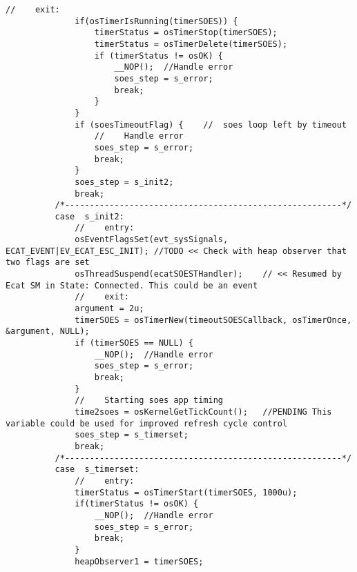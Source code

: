 \begin{lstlisting}[label=lst:soesAPP DSM,caption={Source code for SOES APP DSM}]
              //	exit:
              if(osTimerIsRunning(timerSOES)) {
                  timerStatus = osTimerStop(timerSOES);
                  timerStatus = osTimerDelete(timerSOES);
                  if (timerStatus != osOK) {
                      __NOP();	//Handle error
                      soes_step = s_error;
                      break;
                  }
              }
              if (soesTimeoutFlag) {	//	soes loop left by timeout
                  //	Handle error
                  soes_step = s_error;
                  break;
              }
              soes_step = s_init2;
              break;
          /*--------------------------------------------------------*/
          case  s_init2:
              //	entry:
              osEventFlagsSet(evt_sysSignals, ECAT_EVENT|EV_ECAT_ESC_INIT);	//TODO << Check with heap observer that two flags are set
              osThreadSuspend(ecatSOESTHandler);	// << Resumed by Ecat SM in State: Connected. This could be an event
              //	exit:
              argument = 2u;
              timerSOES = osTimerNew(timeoutSOESCallback, osTimerOnce, &argument, NULL);
              if (timerSOES == NULL) {
                  __NOP();	//Handle error
                  soes_step = s_error;
                  break;
              }
              //	Starting soes app timing
              time2soes = osKernelGetTickCount();	//PENDING This variable could be used for improved refresh cycle control
              soes_step = s_timerset;
              break;
          /*--------------------------------------------------------*/
          case  s_timerset:
              //	entry:
              timerStatus = osTimerStart(timerSOES, 1000u);
              if(timerStatus != osOK) {
                  __NOP();	//Handle error
                  soes_step = s_error;
                  break;
              }
              heapObserver1 = timerSOES;
   

\end{lstlisting}
